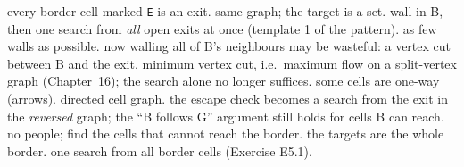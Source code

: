 \begin{variantsbox}
  {every border cell marked \texttt{E} is an exit.}
  {same graph; the target is a set.}
  {wall in B, then one search from \emph{all} open exits at once (template 1 of the pattern).}
  {as few walls as possible.}
  {now walling all of B's neighbours may be wasteful: a vertex cut between B and the exit.}
  {minimum vertex cut, i.e.\ maximum flow on a split-vertex graph (Chapter~16); the search alone no longer suffices.}
  {some cells are one-way (arrows).}
  {directed cell graph.}
  {the escape check becomes a search from the exit in the \emph{reversed} graph; the ``B follows G'' argument still holds for cells B can reach.}
  {no people; find the cells that cannot reach the border.}
  {the targets are the whole border.}
  {one search from all border cells (Exercise E5.1).}
\end{variantsbox}
